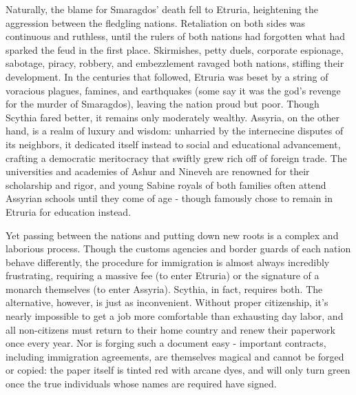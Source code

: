 \documentclass[blue]{Kos}
\begin{document}
Naturally, the blame for Smaragdos' death fell to Etruria, heightening the aggression between the fledgling nations. Retaliation on both sides was continuous and ruthless, until the rulers of both nations had forgotten what had sparked the feud in the first place. Skirmishes, petty duels, corporate espionage, sabotage, piracy, robbery, and embezzlement ravaged both nations, stifling their development. In the centuries that followed, Etruria was beset by a string of voracious plagues, famines, and earthquakes (some say it was the god’s revenge for the murder of Smaragdos), leaving the nation proud but poor. Though Scythia fared better, it remains only moderately wealthy. Assyria, on the other hand, is a realm of luxury and wisdom: unharried by the internecine disputes of its neighbors, it dedicated itself instead to social and educational advancement, crafting a democratic meritocracy that swiftly grew rich off of foreign trade. The universities and academies of Ashur and Nineveh are renowned for their scholarship and rigor, and young Sabine royals of both families often attend Assyrian schools until they come of age - though \cGroom{} famously chose to remain in Etruria for \cGroom{\their} education instead.

Yet passing between the nations and putting down new roots is a complex and laborious process. Though the customs agencies and border guards of each nation behave differently, the procedure for immigration is almost always incredibly frustrating, requiring a massive fee (to enter Etruria) or the signature of a monarch themselves (to enter Assyria). Scythia, in fact, requires both. The alternative, however, is just as inconvenient. Without proper citizenship, it's nearly impossible to get a job more comfortable than exhausting day labor, and all non-citizens must return to their home country and renew their paperwork once every year. Nor is forging such a document easy - important contracts, including immigration agreements, are themselves magical and cannot be forged or copied: the paper itself is tinted red with arcane dyes, and will only turn green once the true individuals whose names are required have signed.
\end{document}
